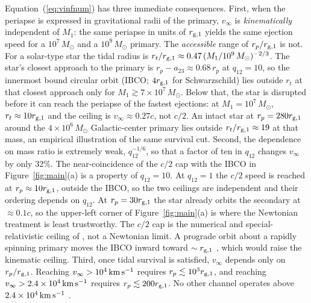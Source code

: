 \documentclass[twocolumn]{aastex701}
\newcommand{\vinf}{v_{\infty}}
\newcommand{\kms}{\,{\rm km\,s^{-1}}}
\newcommand{\Msun}{\,M_{\odot}}
\newcommand{\rg}{r_{{\rm g},1}}
\begin{document}
Equation~(\ref{eq:vinfnum}) has three immediate consequences. First, when the periapse is expressed in
gravitational radii of the primary, $\vinf$ is \emph{kinematically} independent
of $M_{1}$: the same periapse in units of $\rg$ yields the same ejection speed
for a $10^{7}\Msun$ and a $10^{9}\Msun$ primary. The \emph{accessible} range of
$r_{p}/\rg$ is not. For a solar-type star the tidal radius is
$r_{t}/\rg \approx 0.47\,(M_{1}/10^{9}\Msun)^{-2/3}$. The star's closest
approach to the primary is $r_{p}-a_{23}\approx0.68\,r_{p}$ at $q_{12}=10$, so
the innermost bound circular orbit (IBCO; $4\rg$ for Schwarzschild) lies
outside $r_{t}$ at that closest approach only for
$M_{1}\gtrsim7\times10^{7}\Msun$. Below that, the star is disrupted before it
can reach the periapse of the fastest ejections: at $M_{1}=10^{7}\Msun$,
$r_{t}\approx10\rg$ and the ceiling is $\vinf\approx0.27c$, not $c/2$. An
intact star at $r_{p}=280\rg$ around the $4\times10^{6}\Msun$ Galactic-center
primary \citep{gravity26} lies outside $r_{t}/\rg\approx19$ at
that mass, an empirical illustration of the same survival cut. Second, the
dependence on mass ratio is extremely weak, $q_{12}^{-1/6}$, so that a factor
of ten in $q_{12}$ changes $\vinf$ by only $32\%$. The near-coincidence of the
$c/2$ cap with the IBCO in Figure~\ref{fig:main}(a) is a property of
$q_{12}=10$. At $q_{12}=1$ the $c/2$ speed is reached at
$r_{p}\approx10\rg$, outside the IBCO, so the two ceilings are independent
and their ordering depends on $q_{12}$. At $r_{p}=30\rg$ the star already
orbits the secondary at $\approx0.1c$, so the upper-left corner of
Figure~\ref{fig:main}(a) is where the Newtonian treatment is least
trustworthy. The $c/2$ cap is the numerical and special-relativistic ceiling
of , not a Newtonian limit. A prograde orbit about a rapidly
spinning primary moves the IBCO inward toward $\sim\rg$ \citep{bardeen72},
which would raise the kinematic ceiling. Third, once
tidal survival is satisfied, $\vinf$ depends only on $r_{p}/\rg$. Reaching $\vinf>10^{4}\kms$ requires
$r_{p}\lesssim 10^{3}\rg$, and reaching $\vinf>2.4\times10^{4}\kms$ requires
$r_{p}\lesssim 200\rg$. No other channel operates above $2.4\times10^{4}\kms$
\citep{sari10,ginsburg12}.
\end{document}
